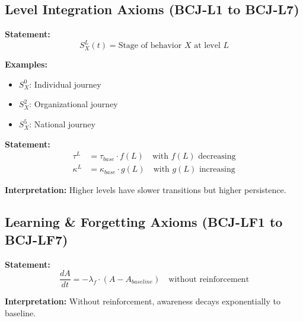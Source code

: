 \subsection{Level Integration Axioms (BCJ-L1 to BCJ-L7)}

\begin{tcolorbox}[colback=gray!5!white, colframe=gray!75!black,
    title=Axiom BCJ-L1: Level-Specific Journeys]
\textbf{Statement:}
\begin{equation}
S^L_X(t) = \text{Stage of behavior } X \text{ at level } L
\end{equation}

\textbf{Examples:}
\begin{itemize}[nosep]
\item $S^0_X$: Individual journey
\item $S^2_X$: Organizational journey
\item $S^5_X$: National journey
\end{itemize}
\end{tcolorbox}

\begin{tcolorbox}[colback=gray!5!white, colframe=gray!75!black,
    title=Axiom BCJ-L4: Level-Specific Parameters]
\textbf{Statement:}
\begin{align}
\tau^L &= \tau_{base} \cdot f(L) \quad \text{with } f(L) \text{ decreasing} \\
\kappa^L &= \kappa_{base} \cdot g(L) \quad \text{with } g(L) \text{ increasing}
\end{align}

\textbf{Interpretation:} Higher levels have slower transitions but higher persistence.
\end{tcolorbox}

\subsection{Learning \& Forgetting Axioms (BCJ-LF1 to BCJ-LF7)}

\begin{tcolorbox}[colback=gray!5!white, colframe=gray!75!black,
    title=Axiom BCJ-LF4: Awareness Decay]
\textbf{Statement:}
\begin{equation}
\frac{dA}{dt} = -\lambda_f \cdot (A - A_{baseline}) \quad \text{without reinforcement}
\end{equation}

\textbf{Interpretation:} Without reinforcement, awareness decays exponentially to baseline.
\end{tcolorbox}

